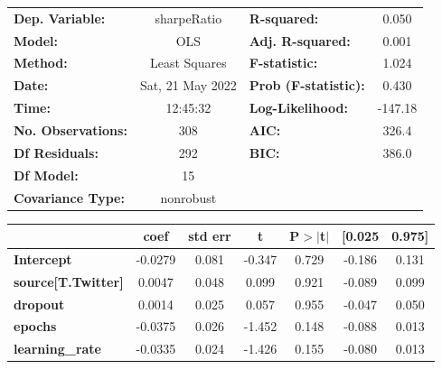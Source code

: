 \begin{center}
\begin{tabular}{lclc}
\toprule
\textbf{Dep. Variable:}              &   sharpeRatio    & \textbf{  R-squared:         } &     0.050   \\
\textbf{Model:}                      &       OLS        & \textbf{  Adj. R-squared:    } &     0.001   \\
\textbf{Method:}                     &  Least Squares   & \textbf{  F-statistic:       } &     1.024   \\
\textbf{Date:}                       & Sat, 21 May 2022 & \textbf{  Prob (F-statistic):} &    0.430    \\
\textbf{Time:}                       &     12:45:32     & \textbf{  Log-Likelihood:    } &   -147.18   \\
\textbf{No. Observations:}           &         308      & \textbf{  AIC:               } &     326.4   \\
\textbf{Df Residuals:}               &         292      & \textbf{  BIC:               } &     386.0   \\
\textbf{Df Model:}                   &          15      & \textbf{                     } &             \\
\textbf{Covariance Type:}            &    nonrobust     & \textbf{                     } &             \\
\bottomrule
\end{tabular}
\begin{tabular}{lcccccc}
                                     & \textbf{coef} & \textbf{std err} & \textbf{t} & \textbf{P$> |$t$|$} & \textbf{[0.025} & \textbf{0.975]}  \\
\midrule
\textbf{Intercept}                   &      -0.0279  &        0.081     &    -0.347  &         0.729        &       -0.186    &        0.131     \\
\textbf{source[T.Twitter]}           &       0.0047  &        0.048     &     0.099  &         0.921        &       -0.089    &        0.099     \\
\textbf{dropout}                     &       0.0014  &        0.025     &     0.057  &         0.955        &       -0.047    &        0.050     \\
\textbf{epochs}                      &      -0.0375  &        0.026     &    -1.452  &         0.148        &       -0.088    &        0.013     \\
\textbf{learning\_rate}              &      -0.0335  &        0.024     &    -1.426  &         0.155        &       -0.080    &        0.013     \\

\end{tabular}
\end{center}

